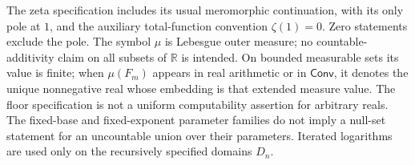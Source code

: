 \documentclass[11pt,reqno]{amsart}
\newcommand{\R}{\mathbb R}
\newcommand{\Conv}{\textsf{Conv}}
\theoremstyle{blueplain}
\newcounter{type}
\newcounter{asser}
\numberwithin{equation}{section}
\begin{document}
The zeta specification includes its usual meromorphic continuation, with its
only pole at \(1\), and the auxiliary total-function convention \(\zeta(1)=0\).
Zero statements exclude the pole. The symbol \(\mu\) is Lebesgue outer measure;
no countable-additivity claim on all subsets of \(\R\) is intended.
On bounded measurable sets its value is finite; when \(\mu(F_m)\)
appears in real arithmetic or in \(\Conv\), it denotes the unique
nonnegative real whose embedding is that extended measure value. The floor
specification is not a uniform computability assertion for arbitrary reals.
The fixed-base and fixed-exponent parameter families do not imply a null-set
statement for an uncountable union over their parameters. Iterated logarithms
are used only on the recursively specified domains \(D_n\).

\label{sec:defs-prim-types}
\label{sec:defs-prim-ops}
\label{sec:defs-prim-pred}
\label{sec:defs-mills}
\label{sec:defs-kanw}
\label{sec:defs-ore}
\label{sec:defs-polygap}
\label{sec:defs-rm}
\label{sec:defs-theta}
\label{sec:defs-iter}
\end{document}
